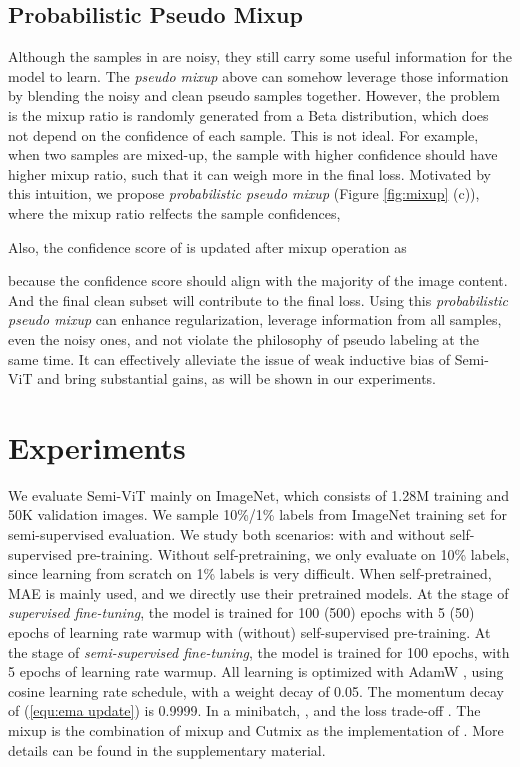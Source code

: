 \documentclass{article}
\begin{document}
\subsection{Probabilistic Pseudo Mixup}

Although the samples in  are noisy, they still carry some useful information for the model to learn. The \emph{pseudo mixup} above can somehow leverage those information by blending the noisy and clean pseudo samples together. However, the problem is the mixup ratio is randomly generated from a Beta distribution, which does not depend on the confidence of each sample. This is not ideal. For example, when two samples are mixed-up, the sample with higher confidence should have higher mixup ratio, such that it can weigh more in the final loss. Motivated by this intuition, we propose \emph{probabilistic pseudo mixup} (Figure \ref{fig:mixup} (c)), where the mixup ratio  relfects the sample confidences,

Also, the confidence score of  is updated after mixup operation as

because the confidence score should align with the majority of the image content. And the final clean subset  will contribute to the final loss. Using this \emph{probabilistic pseudo mixup} can enhance regularization, leverage information from all samples, even the noisy ones, and not violate the philosophy of pseudo labeling at the same time. It can effectively alleviate the issue of weak inductive bias of Semi-ViT and bring substantial gains, as will be shown in our experiments. 


\section{Experiments}

We evaluate Semi-ViT mainly on ImageNet, which consists of 1.28M training and 50K validation images. We sample 10\%/1\% labels from ImageNet training set for semi-supervised evaluation. 
We study both scenarios: with and without self-supervised pre-training. Without self-pretraining, we only evaluate on 10\% labels, since learning from scratch on 1\% labels is very difficult. 
When self-pretrained, MAE \cite{he2021masked} is mainly used, and we directly use their pretrained models. At the stage of \emph{supervised fine-tuning}, the model is trained for 100 (500) epochs with 5 (50) epochs of learning rate warmup with (without) self-supervised pre-training.
At the stage of \emph{semi-supervised fine-tuning}, the model is trained for 100 epochs, with 5 epochs of learning rate warmup. All learning is optimized with AdamW \cite{DBLP:conf/iclr/LoshchilovH19}, using cosine learning rate schedule, with a weight decay of 0.05. The momentum decay  of (\ref{equ:ema update}) is 0.9999. In a minibatch, , and the loss trade-off . The mixup is the combination of mixup \cite{DBLP:conf/iclr/ZhangCDL18} and Cutmix \cite{DBLP:conf/iccv/YunHCOYC19} as the implementation of \cite{rw2019timm}. More details can be found in the supplementary material. 
\end{document}
